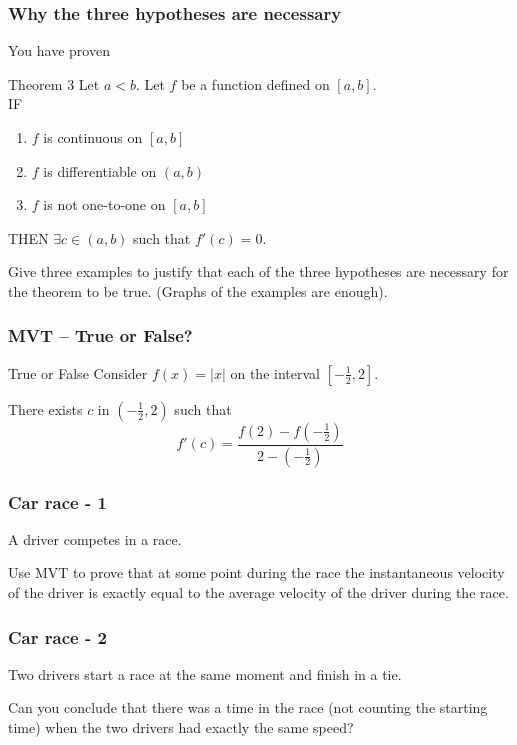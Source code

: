 \documentclass[14pt]{beamer}
\begin{document}
\begin{frame}
	\frametitle{Why the three hypotheses are necessary}

	You have proven

	\begin{block}{Theorem 3}
		Let $a<b$. Let $f$ be a function defined on $[a,b]$. \\ IF
		\begin{enumerate}
			\item $f$ is continuous on $[a,b]$

			\item $f$ is differentiable on $(a,b)$

			\item $f$ is not one-to-one on $[a,b]$
		\end{enumerate}
		THEN $\displaystyle \exists c \in (a,b)$ such that $f'(c)=0$.
	\end{block}

	\vfill

	Give three examples to justify that each of the three hypotheses are necessary
	for the theorem to be true. (Graphs of the examples are enough).
\end{frame}

\begin{frame}[t]
	\frametitle{MVT -- True or False?}

	\begin{block}{True or False}
		Consider $f(x) = |x|$ on the interval $[-\frac{1}{2}, 2]$.

		There exists $c$ in $(-\frac{1}{2},2)$ such that
		\[
			f'(c) = \frac{f(2) - f(-\frac{1}{2})}{2-(-\frac{1}{2})}
		\]
	\end{block}
\end{frame}

\begin{frame}[t]
	\fontsize{13}{13}\selectfont
	\frametitle{Car race - 1}

	A driver competes in a race.

	Use MVT to prove that at some point during the race the instantaneous velocity
	of the driver is exactly equal to the average velocity of the driver during the
	race.
\end{frame}

\begin{frame}[t]
	\fontsize{13}{13}\selectfont
	\frametitle{Car race - 2}

	Two drivers start a race at the same moment and finish in a tie.

	Can you conclude that there was a time in the race (not counting the starting
	time) when the two drivers had exactly the same speed?
\end{frame}
\end{document}
